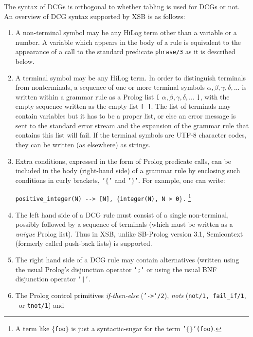 The syntax of DCGs is orthogonal to whether tabling is used for DCGs
or not.  An overview of DCG syntax
 supported by XSB is as follows:
\begin{enumerate}
\item A non-terminal symbol may be any HiLog term other than a variable
      or a number. A variable which appears in the body of a rule is
      equivalent to the appearance of a call to the standard predicate
      {\tt phrase/3} as it is described below.
\item A terminal symbol may be any HiLog term. In order to distinguish 
      terminals from nonterminals, a sequence of one or more terminal
      symbols   $\alpha, \beta, \gamma, \delta, \ldots$
      is written within a grammar rule as a Prolog list 
         {\tt [} $\alpha, \beta, \gamma, \delta, \ldots$ {\tt ]},
      with the empty sequence written as the empty list {\tt [\,]}.
      The list of terminals may contain variables but it has to be a 
      proper list, or else an error message is sent to the standard 
      error stream and the expansion of the grammar rule that contains 
      this list will fail. If the terminal symbols are UTF-8 character
      codes, they can be written (as elsewhere) as strings.
\item Extra conditions, expressed in the form of Prolog predicate calls, 
      can be included in the body (right-hand side) of a grammar rule by 
      enclosing such conditions in curly brackets, {\tt '$\{$'} and
      {\tt '$\}$'}.
      For example, one can write:
      \begin{center}
                {\tt positive\_integer(N) \verb|-->| [N], $\{$integer(N), N > 0$\}$.}
                \footnote{A term like {\tt $\{$foo$\}$} is just a
			  syntactic-sugar for the term {\tt '$\{\}$'(foo)}.}
      \end{center}
\item The left hand side of a DCG rule must consist of a single non-terminal,
      possibly followed by a sequence of terminals (which must be written as
      a {\em unique} Prolog list). Thus in XSB, unlike SB-Prolog 
      version 3.1, Semicontext (formerly called push-back lists) is supported.
\item The right hand side of a DCG rule may contain alternatives (written 
      using the usual Prolog's disjunction operator {\tt ';'} or 
      using the usual BNF disjunction operator {\tt '|'}. 
\item The Prolog control primitives {\em if-then-else} ({\tt '->'/2}),
      {\em nots} ({\tt not/1, fail\_if/1}, \not\ or {\tt tnot/1}) and 

\end{enumerate}
